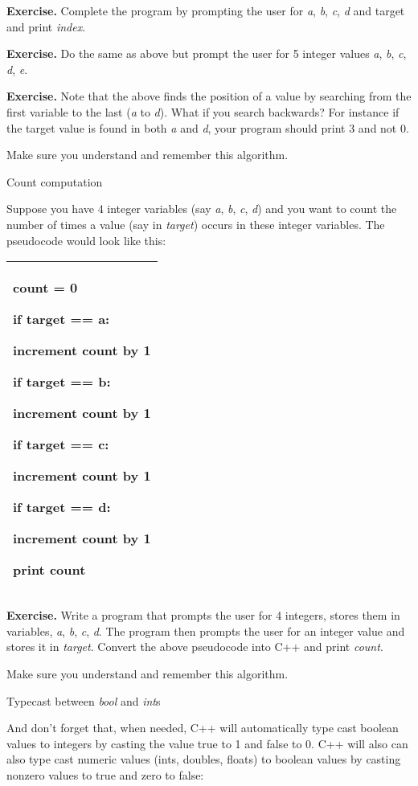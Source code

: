 \documentclass[
]{article}
\begin{document}
\textbf{Exercise.} Complete the program by prompting the user for
\emph{a}, \emph{b}, \emph{c}, \emph{d} and target and print
\emph{index}.

\textbf{Exercise.} Do the same as above but prompt the user for 5
integer values \emph{a}, \emph{b}, \emph{c}, \emph{d}, \emph{e}.

\textbf{Exercise.} Note that the above finds the position of a value by
searching from the first variable to the last (\emph{a} to \emph{d}).
What if you search backwards? For instance if the target value is found
in both \emph{a} and \emph{d}, your program should print 3 and not 0.

Make sure you understand and remember this algorithm.

Count computation

Suppose you have 4 integer variables (say \emph{a}, \emph{b}, \emph{c},
\emph{d}) and you want to count the number of times a value (say in
\emph{target}) occurs in these integer variables. The pseudocode would
look like this:

\begin{longtable}[]{@{}l@{}}
\toprule
\endhead
\begin{minipage}[t]{0.97\columnwidth}\raggedright
count = 0

if target == a:

increment count by 1

if target == b:

increment count by 1

if target == c:

increment count by 1

if target == d:

increment count by 1

print count\strut
\end{minipage}\tabularnewline
\bottomrule
\end{longtable}

\textbf{Exercise.} Write a program that prompts the user for 4 integers,
stores them in variables, \emph{a}, \emph{b}, \emph{c}, \emph{d}. The
program then prompts the user for an integer value and stores it in
\emph{target}. Convert the above pseudocode into C++ and print
\emph{count}.

Make sure you understand and remember this algorithm.

Typecast between \emph{bool} and \emph{int}s

And don't forget that, when needed, C++ will automatically type cast
boolean values to integers by casting the value true to 1 and false to
0. C++ will also can also type cast numeric values (ints, doubles,
floats) to boolean values by casting nonzero values to true and zero to
false:
\end{document}
